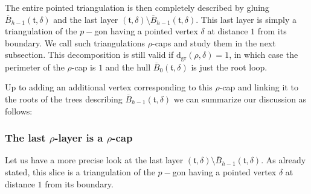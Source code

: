 \documentclass[10pt]{amsart}
\theoremstyle{definition}\newtheorem{defi}[theo]{Definition}\newtheorem{rema}[theo]{Remark}\newtheorem{exam}[theo]{Example}\newtheorem{exem}[theo]{Example}\newtheorem{nota}[theo]{Notation}
\begin{document}
The entire pointed triangulation is then completely described by gluing $\overline{B}_{h-1}( \mathfrak{t}, \delta)$ and the last layer $(\mathfrak{t},\delta) \setminus \overline{B}_{h-1}( \mathfrak{t}, \delta)$. This last layer is simply a triangulation of the $p-$gon having a pointed vertex $\delta$ at distance $1$ from its boundary. We call such triangulations $\rho$-caps and study them in the next subsection. This decomposition is still valid if $ \mathrm{d_{gr}}(\rho,\delta)=1$, in which case the perimeter of the $\rho$-cap is $1$ and the hull $\overline{B}_{0}( \mathfrak{t}, \delta)$ is just the root loop.

Up to adding an additional vertex corresponding to this $\rho$-cap and linking it to the roots of the trees describing $\overline{B}_{h-1}( \mathfrak{t}, \delta)$ we can summarize  our discussion as follows:

\begin{center}
\end{center}

\subsubsection{The last \texorpdfstring{$\rho$-}{rho-}layer is a \texorpdfstring{$\rho$-}{rho-}cap}
\label{sec:rhocap}

Let us have a more precise look at the last layer $(\mathfrak{t},\delta) \setminus \overline{B}_{h-1}( \mathfrak{t}, \delta)$. As already stated, this slice is a triangulation of the $p-$gon having a pointed vertex $\delta$ at distance $1$ from its boundary.
\end{document}
